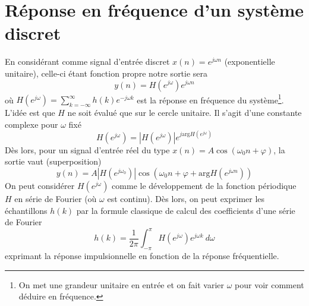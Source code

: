 \section{Réponse en fréquence d'un système discret}
En considérant comme signal d'entrée discret $x(n) = e^{j\omega n}$ (exponentielle unitaire), 
celle-ci étant fonction propre notre sortie sera
\begin{equation}
y(n) = H\left(e^{j\omega }\right)e^{j\omega n}
\end{equation}
où $\displaystyle H\left(e^{j\omega }\right) = \sum_{k=-\infty}^\infty h(k)e^{-j
\omega k}$ est la réponse en fréquence du système\footnote{On met une grandeur unitaire 
en entrée et on fait varier $\omega$ pour voir comment déduire en fréquence.}. L'idée 
est que $H$ ne soit évalué que sur le cercle unitaire. Il s'agit d'une constante complexe 
pour $\omega$ fixé
\begin{equation}
H\left(e^{j\omega }\right) = \left|H\left(e^{j\omega }\right)\right|e^{j\text{arg} 
H\left(e^{j\omega }\right)}
\end{equation}
Dès lors, pour un signal d'entrée réel du type $x(n) = A\cos(\omega_0n+\varphi)$, la 
sortie vaut (superposition)
\begin{equation}
y(n) = A \left|H\left(e^{j\omega_0 }\right)\right|\cos\left(\omega_0n+\varphi+\text{arg} 
H\left(e^{j\omega n}\right)\right)
\end{equation}
On peut considérer $H\left(e^{j\omega}\right)$ comme le développement de la fonction 
périodique $H$ en série de Fourier (où $\omega$ est continu). Dès lors, on peut exprimer 
les échantillons $h(k)$ par la formule classique de calcul des coefficients d'une série 
de Fourier
\begin{equation}
h(k) = \frac{1}{2\pi}\int_{-\pi}^\pi H\left(e^{j\omega }\right)e^{j\omega k}\ d\omega
\end{equation}
exprimant la réponse impulsionnelle en fonction de la réponse fréquentielle.



\newpage
